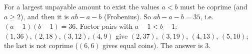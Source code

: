 For a largest unpayable amount to exist the values $a<b$ must be coprime (and $a\ge2$), and then it is $ab-a-b$ (Frobenius). So $ab-a-b=35$, i.e. $(a-1)(b-1)=36$. Factor pairs with $a-1<b-1$: $(1,36),(2,18),(3,12),(4,9)$ give $(2,37)$, $(3,19)$, $(4,13)$, $(5,10)$; the last is not coprime ($(6,6)$ gives equal coins). The answer is $\boxed{3}$.
